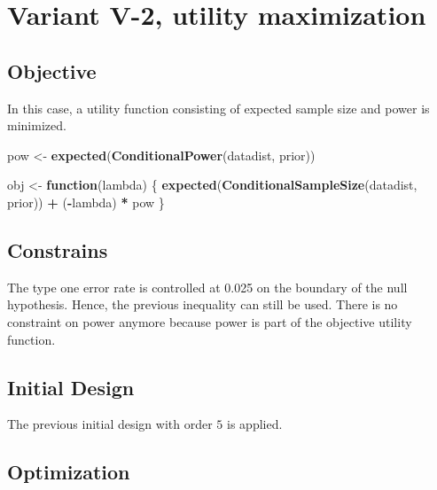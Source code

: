 \documentclass[]{book}
\newenvironment{Shaded}{\begin{snugshade}}{\end{snugshade}}
\newcommand{\ControlFlowTok}[1]{\textcolor[rgb]{0.13,0.29,0.53}{\textbf{#1}}}
\newcommand{\KeywordTok}[1]{\textcolor[rgb]{0.13,0.29,0.53}{\textbf{#1}}}
\newcommand{\NormalTok}[1]{#1}
\newcommand{\OperatorTok}[1]{\textcolor[rgb]{0.81,0.36,0.00}{\textbf{#1}}}
\newcommand{\StringTok}[1]{\textcolor[rgb]{0.31,0.60,0.02}{#1}}
\begin{document}
\hypertarget{variantV_2}{%
\section{Variant V-2, utility maximization}\label{variantV_2}}

\hypertarget{objective-11}{%
\subsection{Objective}\label{objective-11}}

In this case, a utility function consisting of expected sample size and
power is minimized.

\begin{Shaded}
\begin{Highlighting}[]
\NormalTok{pow <-}\StringTok{ }\KeywordTok{expected}\NormalTok{(}\KeywordTok{ConditionalPower}\NormalTok{(datadist, prior))}

\NormalTok{obj <-}\StringTok{ }\ControlFlowTok{function}\NormalTok{(lambda) \{}
    \KeywordTok{expected}\NormalTok{(}\KeywordTok{ConditionalSampleSize}\NormalTok{(datadist, prior)) }\OperatorTok{+}\StringTok{  }
\StringTok{        }\NormalTok{(}\OperatorTok{-}\NormalTok{lambda) }\OperatorTok{*}\StringTok{ }\NormalTok{pow}
\NormalTok{\}}
\end{Highlighting}
\end{Shaded}

\hypertarget{constrains-11}{%
\subsection{Constrains}\label{constrains-11}}

The type one error rate is controlled at 0.025 on the boundary of the
null hypothesis. Hence, the previous inequality can still be used.
There is no constraint on power anymore because power is part of the
objective utility function.

\hypertarget{initial-design-10}{%
\subsection{Initial Design}\label{initial-design-10}}

The previous initial design with order \(5\) is applied.

\hypertarget{optimization-10}{%
\subsection{Optimization}\label{optimization-10}}
\end{document}
